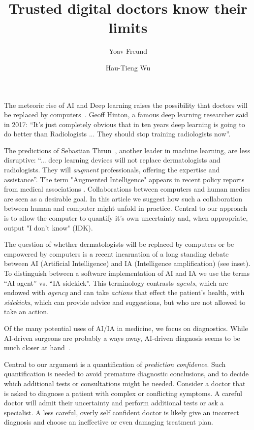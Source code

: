 \documentclass[11pt]{pnas-new}
\author[1]{Yoav Freund}
\author[2]{Hau-Tieng Wu}
\affil[1]{UCSD, Computer Science, San Diego, 92093, United States}
\affil[2]{Duke, Mathematics and Statistical Science, Durham, 27708, USA}
\title{Trusted digital doctors know their limits}
\newlength{\strutheight}
\begin{document}
\settoheight{\strutheight}{\strut}

 
\maketitle


The meteoric rise of AI and Deep learning raises the possibility that
doctors will be replaced by computers~\cite{Mukherjee2017}. Geoff Hinton,
a famous deep learning researcher said in 2017: ``It's just completely
obvious that in ten years deep learning is going to do better than
Radiologists ... They should stop training radiologists now''.

The predictions of Sebastian
Thrun~\cite{Mukherjee2017,esteva2017dermatologist}, another leader in
machine learning, are less disruptive: ``... deep learning devices
will not replace dermatologists and radiologists. They will {\em
  augment} professionals, offering the expertise and assistance''. 
  The term "Augmented Intelligence" appears in recent 
  policy reports from medical associations \cite{american2019augmented,AAD2019augmented}. Collaborations between computers and human medics are seen as a desirable goal.
  In this article we suggest how such a collaboration between human and computer might unfold in practice. Central to our approach is to allow the computer to quantify it's own uncertainty and, when appropriate, output "I don't know" (IDK).
 
 The question of whether dermatologists will be
replaced by computers or be empowered by computers is a recent
incarnation of a long standing debate between AI (Artificial Intelligence) and IA
(Intelligence amplification) (see inset). To
distinguish between a software implementation of AI and IA we use the terms ``AI agent'' vs. ``IA
sidekick''. This terminology contrasts {\em agents}, which are endowed
with {\em agency} and can take {\em actions} that effect the patient's
health, with {\em sidekicks}, which can provide advice and suggestions,
but who are not allowed to take an action.

Of the many potential uses of AI/IA in medicine, we focus on diagnostics.
While AI-driven surgeons are probably a ways away, AI-driven diagnosis seems
to be much closer at hand~\cite{topol2019deep}. 

Central to our argument is a quantification of {\em prediction
  confidence}. Such quantification is needed to avoid premature
diagnostic conclusions, and to decide which additional tests or
consultations might be needed. Consider a doctor that is asked
to diagnose a patient with complex or conflicting symptoms. A careful
doctor will admit their uncertainty and perform additional tests or
ask a specialist. A less careful, overly self confident doctor is
likely give an incorrect diagnosis and choose an ineffective or even damaging
treatment plan.
\end{document}

